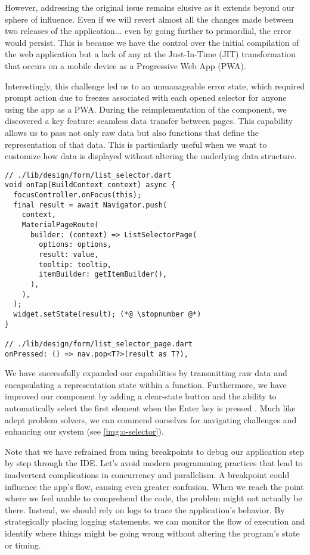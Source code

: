 \noindent However, addressing the original issue remains elusive as it extends beyond our sphere of influence. Even if 
we will revert almost all the changes made between two releases of the application... even by going further to 
primordial, the error would persist. This is because we have the control over the initial compilation of the web 
application but a lack of any at the Just-In-Time (JIT) transformation that occurs on a mobile device as a Progressive 
Web App (PWA).

Interestingly, this challenge led us to an unmanageable error state, which required prompt action due to freezes 
associated with each opened selector for anyone using the app as a PWA. During the reimplementation of the component, we 
discovered a key feature: seamless data transfer between pages. This capability allows us to pass not only raw data but also functions that define the representation of that data. This is particularly useful when we want to customize how data is displayed without altering the underlying data structure.

\begin{lstlisting}
// ./lib/design/form/list_selector.dart
void onTap(BuildContext context) async {
  focusController.onFocus(this);
  final result = await Navigator.push(
    context,
    MaterialPageRoute(
      builder: (context) => ListSelectorPage(
        options: options,
        result: value,
        tooltip: tooltip,
        itemBuilder: getItemBuilder(),
      ),
    ),
  );
  widget.setState(result); (*@ \stopnumber @*)
}

// ./lib/design/form/list_selector_page.dart
onPressed: () => nav.pop<T?>(result as T?),
\end{lstlisting}

\noindent We have successfully expanded our capabilities by transmitting raw data and encapsulating a representation 
state within a function. Furthermore, we have improved our component by adding a clear-state button and the ability to 
automatically select the first element when the Enter key is pressed . Much like adept problem solvers, we 
can commend ourselves for navigating challenges and enhancing our system (see \cref{img:o-selector}).


\noindent Note that we have refrained from using breakpoints to debug our application step by step through the IDE. 
Let's avoid modern programming practices that lead to inadvertent complications in concurrency and parallelism. A 
breakpoint could influence the app's flow, causing even greater confusion. When we reach the point where we feel unable 
to comprehend the code, the problem might not actually be there. Instead, we should rely on logs to trace the application's behavior. By strategically placing logging statements, we can monitor the flow of execution and identify where things might be going wrong without altering the program's state or timing.
